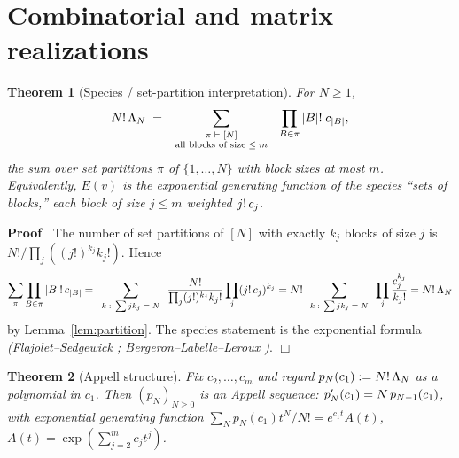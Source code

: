 \documentclass{article}
\newcommand{\assign}{:=}
\newcommand{\tmem}[1]{{\em #1\/}}
\newcommand{\tmscript}[1]{\text{\scriptsize{$#1$}}}
\newenvironment{proof}{\noindent\textbf{Proof\ }}{\hspace*{\fill}$\Box$\medskip}
\newtheorem{theorem}{Theorem}
\begin{document}
\section{Combinatorial and matrix realizations}\label{sec:combinatorics}

\begin{theorem}
  [Species / set-partition interpretation]\label{thm:species} For $N \ge 1$,
  \[ N! \hspace{0.17em} \Lambda_N \hspace{0.27em} = \hspace{0.27em}
     \sum_{\tmscript{\begin{array}{c}
       \pi \vdash [N]\\
       \text{all blocks of size} \le m
     \end{array}}} \hspace{0.27em} \prod_{B \in \pi} |B| ! \hspace{0.27em}
     c_{|B|}, \]
  the sum over set partitions $\pi$ of $\{1, \ldots, N\}$ with block sizes at
  most $m$. Equivalently, $E (v)$ is the exponential generating function of
  the species ``sets of blocks,'' each block of size $j \le m$ weighted $j!
  \hspace{0.17em} c_j$.
\end{theorem}

\begin{proof}
  The number of set partitions of $[N]$ with exactly $k_j$ blocks of size $j$
  is $N! / \prod_j ((j!)^{k_j} k_j !)$. Hence
  \[ \sum_{\pi} \prod_{B \in \pi} |B| ! \hspace{0.17em} c_{|B|} =
     \sum_{\tmscript{\begin{array}{c}
       k : \hspace{0.17em} \sum jk_j = N
     \end{array}}} \frac{N!}{\prod_j (j!)^{k_j} k_j !}  \prod_j (j!
     \hspace{0.17em} c_j)^{k_j} = N! \sum_{\tmscript{\begin{array}{c}
       k : \hspace{0.17em} \sum jk_j = N
     \end{array}}} \prod_j \frac{c_j^{k_j}}{k_j !} = N! \hspace{0.17em}
     \Lambda_N \]
  by Lemma~\ref{lem:partition}. The species statement is the exponential
  formula {\tmem{(Flajolet--Sedgewick {\cite[II.2]{FS}};
  Bergeron--Labelle--Leroux {\cite{BLL}})}}.
\end{proof}

\begin{theorem}
  [Appell structure]\label{thm:appell} Fix $c_2, \ldots, c_m$ and regard $p_N
  (c_1) \assign N! \hspace{0.17em} \Lambda_N$ as a polynomial in $c_1$. Then
  $(p_N)_{N \ge 0}$ is an Appell sequence: $p_N' (c_1) = N \hspace{0.17em}
  p_{N - 1} (c_1)$, with exponential generating function $\sum_N p_N (c_1) t^N
  / N! = e^{c_1 t} A (t)$, $A (t) = \exp \left( \sum_{j = 2}^m c_j t^j
  \right)$.
\end{theorem}
\end{document}
